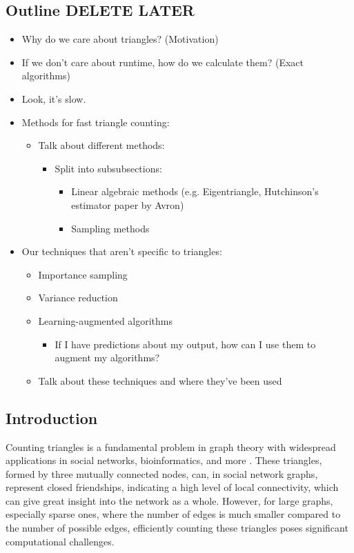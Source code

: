 \documentclass[12pt]{article}
\begin{document}
\subsection{Outline DELETE LATER}
\begin{itemize}
    \item Why do we care about triangles? (Motivation)
    \item If we don't care about runtime, how do we calculate them? (Exact algorithms)
    \item Look, it's slow.
    \item Methods for fast triangle counting:
    \begin{itemize}
        \item Talk about different methods:
        \begin{itemize}
            \item Split into subsubsections:
            \begin{itemize}
                \item Linear algebraic methods (e.g. Eigentriangle, Hutchinson's estimator paper by Avron)
                \item Sampling methods
            \end{itemize}
        \end{itemize}
    \end{itemize}
    \item Our techniques that aren't specific to triangles:
    \begin{itemize}
        \item Importance sampling
        \item Variance reduction
        \item Learning-augmented algorithms
        \begin{itemize}
            \item If I have predictions about my output, how can I use them to augment my algorithms?
        \end{itemize}
        \item Talk about these techniques and where they've been used
    \end{itemize}
\end{itemize}

\subsection{Introduction}

Counting triangles is a fundamental problem in graph theory with widespread applications in social networks, bioinformatics, and more \cite{lovasz_large_2012}.
These triangles, formed by three mutually connected nodes, can, in social network graphs, represent closed friendships, indicating a high level of local connectivity, which can give great insight into the network as a whole.
However, for large graphs, especially sparse ones, where the number of edges is much smaller compared to the number of possible edges, efficiently counting these triangles poses significant computational challenges.
\end{document}
